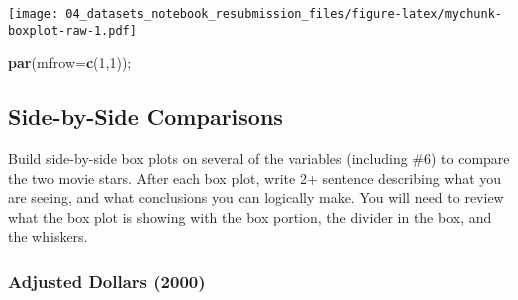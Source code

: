 \documentclass[
]{article}
\newenvironment{Shaded}{\begin{snugshade}}{\end{snugshade}}
\newcommand{\DataTypeTok}[1]{\textcolor[rgb]{0.13,0.29,0.53}{#1}}
\newcommand{\DecValTok}[1]{\textcolor[rgb]{0.00,0.00,0.81}{#1}}
\newcommand{\FloatTok}[1]{\textcolor[rgb]{0.00,0.00,0.81}{#1}}
\newcommand{\KeywordTok}[1]{\textcolor[rgb]{0.13,0.29,0.53}{\textbf{#1}}}
\newcommand{\NormalTok}[1]{#1}
\newcommand{\OperatorTok}[1]{\textcolor[rgb]{0.81,0.36,0.00}{\textbf{#1}}}
\newcommand{\StringTok}[1]{\textcolor[rgb]{0.31,0.60,0.02}{#1}}
\begin{document}
\begin{Shaded}
\end{Shaded}

\texttt{[image: 04\_datasets\_notebook\_resubmission\_files/figure-latex/mychunk-boxplot-raw-1.pdf]}

\begin{Shaded}
\begin{Highlighting}[]
    \KeywordTok{par}\NormalTok{(}\DataTypeTok{mfrow=}\KeywordTok{c}\NormalTok{(}\DecValTok{1}\NormalTok{,}\DecValTok{1}\NormalTok{));}
\end{Highlighting}
\end{Shaded}

\hypertarget{side-by-side-comparisons}{%
\subsection{Side-by-Side Comparisons}\label{side-by-side-comparisons}}

Build side-by-side box plots on several of the variables (including \#6)
to compare the two movie stars. After each box plot, write 2+ sentence
describing what you are seeing, and what conclusions you can logically
make. You will need to review what the box plot is showing with the box
portion, the divider in the box, and the whiskers.

\hypertarget{adjusted-dollars-2000}{%
\subsubsection{Adjusted Dollars (2000)}\label{adjusted-dollars-2000}}
\end{document}
